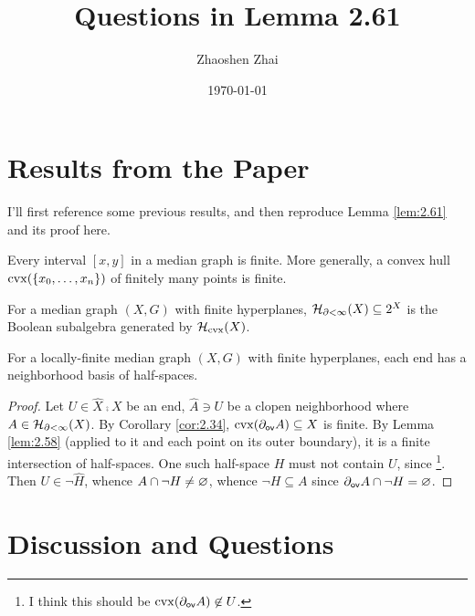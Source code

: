 \documentclass{amsart}
\begin{document}
    \title{Questions in Lemma 2.61}
    \author{Zhaoshen Zhai}
    \date{\today}
    \maketitle

    \section{Results from the Paper}

    \setcounter{section}{2}
    I'll first reference some previous results, and then reproduce Lemma \ref{lem:2.61} and its proof here.

    \setcounter{theorem}{33}
    \begin{corollary}\label{cor:2.34}
        Every interval $[x,y]$ in a median graph is finite. More generally, a convex hull $\cvx(\l\{x_0,\dots,x_n\r\})$ of finitely many points is finite.
    \end{corollary}

    \setcounter{theorem}{57}
    \begin{lemma}\label{lem:2.58}
        For a median graph $(X,G)$ with finite hyperplanes, $\mc{H}_{\del<\infty}(X)\subseteq2^X$ is the Boolean subalgebra generated by $\mc{H}_\textrm{cvx}(X)$.
    \end{lemma}

    \setcounter{theorem}{60}
    \begin{lemma}\label{lem:2.61}
        For a locally-finite median graph $(X,G)$ with finite hyperplanes, each end has a neighborhood basis of half-spaces.
    \end{lemma}
    \begin{proof}
        Let $U\in\widehat{X}\comp X$ be an end, $\widehat{A}\ni U$ be a clopen neighborhood where $A\in\mc{H}_{\del<\infty}(X)$. By Corollary \ref{cor:2.34}, $\cvx(\del_\sf{ov}A)\subseteq X$ is finite. By Lemma \ref{lem:2.58} (applied to it and each point on its outer boundary), it is a finite intersection of half-spaces. One such half-space $H$ must not contain $U$, since {}\footnote{I think this should be $\cvx(\del_\sf{ov}A)\not\in U$.}. Then $U\in\lnot\widehat{H}$, whence $A\cap\lnot H\neq\em$, whence $\lnot H\subseteq A$ since $\del_\sf{ov}A\cap\lnot H=\em$.
    \end{proof}

    \setcounter{section}{1}
    \section{Discussion and Questions}
\end{document}
